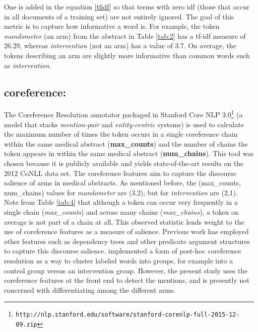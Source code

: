 One is added in the equation \eqref{tfidf} so that terms with zero idf (those that occur in all documents of a training set) are not entirely ignored. The goal of this metric is to capture how informative a word is. For example, the token \textit{mandometer} (an arm) from the abstract in Table \ref{tab:2} has a tf-idf measure of 26.29, whereas \textit{intervention} (not an arm) has a value of 3.7. On average, the tokens describing an arm are slightly more informative than common words such as \textit{intervention}.

\subsection*{coreference:}\label{subsec:coref-features} The Coreference Resolution annotator packaged in Stanford Core NLP 3.0\footnote{\scriptsize {\tt http://nlp.stanford.edu/software/stanford-corenlp-full-2015-12-09.zip}} (a model that stacks \textit{mention-pair} and \textit{entity-centric} systems) is used to calculate the maximum number of times the token occurs in a single coreference chain within the same medical abstract (\textbf{max\_counts}) and the number of chains the token appears in within the same medical abstract (\textbf{num\_chains}). This tool was chosen because it is publicly available and yields state-of-the-art results on the 2012 CoNLL data set. The coreference features aim to capture the discourse salience of arms in medical abstracts. As mentioned before, the (max\_counts, num\_chains) values for \textit{mandometer} are (3,2), but for \textit{intervention} are (2,1). Note from Table \ref{tab:4} that although a token can occur very frequently in a single chain (\textit{max\_counts}) and across many chains (\textit{max\_chains}), a token on average is not part of a chain at all. This observed statistic lends weight to the use of coreference features as a measure of salience. Previous work has employed other features such as dependency trees and other predicate argument structures to capture this discourse salience.  implemented a form of post-hoc coreference resolution as a way to cluster labeled words into groups, for example into a control group versus an intervention group. However, the present study uses the coreference features at the front end to detect the mentions, and is presently not concerned with differentiating among the different arms. 

